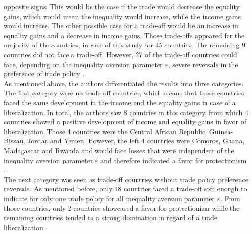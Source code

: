 opposite signs. This would be the case if the trade would decrease the equality gains, which would mean the inequality would
increase, while the income gains would increase. The other possible case for a trade-off would be an increase in equality gains
and a decrease in income gains. Those trade-offs appeared for the majority of the countries, in case of this study for 45 countries.
The remaining 9 countries did not face a trade-off. However, 27 of the trade-off countries could face, depending on the inequality
aversion parameter \(\varepsilon\), severe reversals in the preference of trade policy \parencite[p.~19]{Artuc.2019}. \\

As mentioned above, the authors differentiated the results into three categories. The first category were no trade-off countries, which means
that those countries faced the same development in the income and the equality gains in case of a liberalization. In total, the authors saw
8 countries in this category, from which 4 countries showed a positive development of income and equality gains in favor of liberalization. 
Those 4 countries were the Central African Republic, Guinea-Bissau, Jordan and Yemen. However, the left 4 countries were Comoros, Ghana, 
Madagascar and Rwanda and would face losses that were independent of the inequality aversion parameter \(\varepsilon\) and therefore indicated 
a favor for protectionism \parencite[p.~20]{Artuc.2019}. \\

The next category was seen as trade-off countries without trade policy preference reversals. As mentioned before, only 18 countries faced a 
trade-off soft enough to indicate for only one trade policy for all inequality aversion parameter \(\varepsilon\). From those countries, 
only 2 countries showcased a favor for protectionism while the remaining countries tended to a strong domination in regard of a trade liberalization
 \parencite[pp.~20-21]{Artuc.2019}. \\

